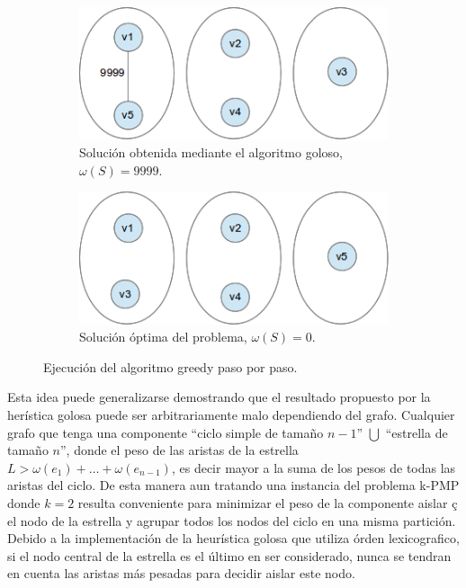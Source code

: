 \begin{figure}[H]
        \centering
        \begin{subfigure}[b]{0.7\textwidth}
                \includegraphics[width=\textwidth]{ej3/greedy_graph_star+cicle_partition_example1.png}
                \caption{Soluci\'on obtenida mediante el algoritmo goloso, $\omega(S) = 9999$.}
                \label{fig:greedy_fig_3}
        \end{subfigure}%
         \qquad
         \qquad
         \qquad
         \qquad
         \qquad
        \begin{subfigure}[b]{0.7\textwidth}
                \includegraphics[width=\textwidth]{ej3/greedy_graph_star+cicle_partition_example2.png}
                \caption{Soluci\'on \'optima del problema, $\omega(S) = 0$.}
                \label{fig:greedy_fig_4}
        \end{subfigure}
        \caption{Ejecuci\'on del algoritmo greedy paso por paso.}
        \label{greedy_algorith_example2}
\end{figure}

Esta idea puede generalizarse demostrando que el resultado propuesto por la her\'istica golosa puede ser arbitrariamente malo dependiendo del grafo. Cualquier
grafo que tenga una componente ``ciclo simple de tama\~no $n-1$'' $\bigcup$ ``estrella de tama\~no $n$'', donde el peso de las aristas de la estrella $L > \omega(e_{1}) + \ldots + \omega(e_{n-1})$, es decir
mayor a la suma de los pesos de todas las aristas del ciclo. De esta manera aun tratando una instancia del problema k-PMP donde $k=2$ resulta conveniente para minimizar el peso de la componente  aislar ç
el nodo de la estrella y agrupar todos los nodos del ciclo en una misma partici\'on. \\
Debido a la implementaci\'on de la heur\'istica golosa que utiliza \'orden lexicografico, si el nodo central de la estrella es el \'ultimo en ser considerado, nunca se tendran en cuenta las aristas
m\'as pesadas para decidir aislar este nodo.

